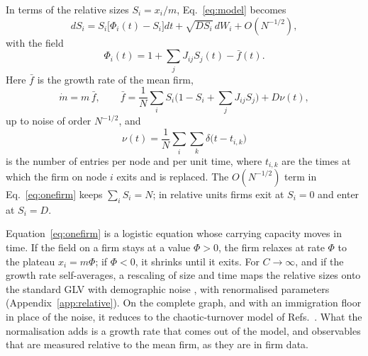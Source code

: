 \documentclass[pre,twocolumn,superscriptaddress,nofootinbib]{revtex4-2}
\begin{document}
In terms of the relative sizes $S_i=x_i/m$, Eq.~\eqref{eq:model} becomes
\begin{equation}
dS_i=S_i\big[\Phi_i(t)-S_i\big]dt+\sqrt{DS_i}\,dW_i+O(N^{-1/2}),
\label{eq:onefirm}
\end{equation}
with the field
\begin{equation}
\Phi_i(t)=1+\sum_jJ_{ij}S_j(t)-\bar f(t).
\label{eq:field}
\end{equation}
Here $\bar f$ is the growth rate of the mean firm,
\begin{equation}
\dot m=m\,\bar f,\qquad \bar f=\frac1N\sum_iS_i\Big(1-S_i+\sum_jJ_{ij}S_j\Big)+D\nu(t),
\label{eq:mean}
\end{equation}
up to noise of order $N^{-1/2}$, and
\begin{equation}
\nu(t)=\frac1N\sum_i\sum_k\delta\big(t-t_{i,k}\big)
\label{eq:nu}
\end{equation}
is the number of entries per node and per unit time, where $t_{i,k}$ are the times at which the firm on
node $i$ exits and is replaced.  The $O(N^{-1/2})$ term in Eq.~\eqref{eq:onefirm}
keeps $\sum_iS_i=N$; in relative units firms exit at $S_i=0$ and enter at $S_i=D$.

Equation~\eqref{eq:onefirm} is a logistic equation whose carrying capacity moves in time.  If the
field on a firm stays at a value $\Phi>0$, the firm relaxes at rate $\Phi$ to the plateau $x_i=m\Phi$;
if $\Phi<0$, it shrinks until it exits.  For $C\to\infty$, and if the growth rate self-averages, a
rescaling of size and time maps the relative sizes onto the standard GLV with demographic noise
\cite{altieri2021}, with renormalised parameters (Appendix~\ref{app:relative}).  On the complete graph,
and with an immigration floor in place of the noise, it reduces to the chaotic-turnover model of
Refs.~\cite{bunin2017,mallmin2024}.  What the normalisation adds is a growth rate that comes out of the
model, and observables that are measured relative to the mean firm, as they are in firm data.

\end{document}
